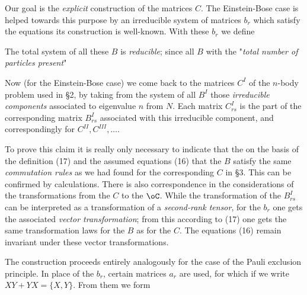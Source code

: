 \begin{paper}{1}
Our goal is the \textit{explicit} construction of the matrices $C$. The Einstein-Bose case is helped towards this purpose by an irreducible system of matrices $b_r$ which satisfy the equations
its construction is well-known. With these $b_r$ we define

The total system of all these $B$ is \textit{reducible}; since all $B$  with the "\textit{total number of particles present}"

Now (for the Einstein-Bose case) we come back to the matrices $C^I$ of the $n$-body problem used in \S2, by taking from the system of all $B^I$ those \textit{irreducible components} associated to eigenvalue $n$ from $N$. Each matrix $C_{rs}^I$ is the part of the corresponding matrix $B_{rs}^I$ associated with this irreducible component, and correspondingly for $C^{II}, C^{III}, \dots$.

To prove this claim it is really only necessary to indicate that the on the basis of the definition (17) and the assumed equations (16) that the $B$ satisfy the same \textit{commutation rules} as we had found for the corresponding $C$ in \S3. This can be confirmed by calculations. There is also correspondence in the considerations of the transformations from the $C$ to the $\oC$. While the transformation of the $B^I_{rs}$ can be interpreted as a transformation of a \textit{second-rank tensor}, for the $b_r$ one gets the associated \textit{vector transformation}; from this according to (17) one gets the same transformation laws for the $B$ as for the $C$. The equations (16) remain invariant under these vector transformations.

The construction proceeds entirely analogously for the case of the Pauli exclusion principle. In place of the $b_r$, certain matrices $a_r$ are used, for which
if we write $XY+YX=\{X,Y\}$. From them we form


\end{paper}
